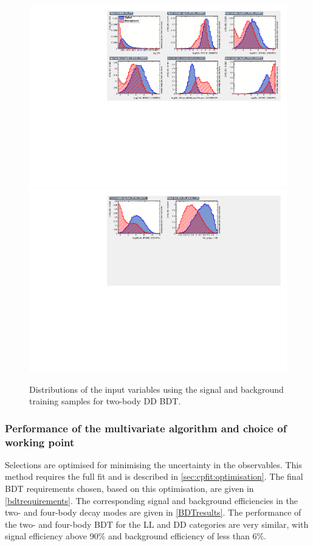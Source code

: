 \begin{figure}
\centering
\includegraphics[width=\linewidth]{figures/selection/inputvariables_KPi_DD_run1_1.pdf}
\includegraphics[trim = 0mm 50mm 0mm 0mm, clip,width=\linewidth]{figures/selection/inputvariables_KPi_DD_run1_2.pdf}
\caption{Distributions of the input variables using the signal and background training samples for two-body DD BDT.}
\label{BDTinputdist2bodyDD}
\end{figure}

\subsubsection{Performance of the multivariate algorithm and choice of working point}

Selections are optimised for minimising the uncertainty in the \CP observables. This method requires the full fit and is described in \sect\ref{sec:cpfit:optimisation}. The final BDT requirements chosen, based on this optimisation, are given in \tab\ref{bdtrequirements}. The corresponding signal and background efficiencies in the two- and four-body \Dz decay modes are given in \tab\ref{BDTresults}. The performance of the two- and four-body BDT for the LL and DD categories are very similar, with signal efficiency above 90\% and background efficiency of less than 6\%. 

